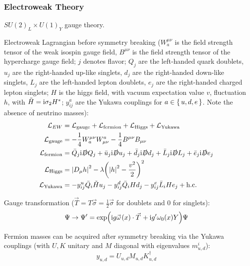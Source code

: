 		\subsubsection{Electroweak Theory}
			$SU(2)_L \times U(1)_Y$ gauge theory.

			Electroweak Lagrangian before symmetry breaking ($W_a^{\mu\nu}$ is the field strength tensor of the weak isospin gauge field, $B^{\mu\nu}$ is the field strength tensor of the hypercharge gauge field; $j$ denotes flavor; $Q_j$ are the left-handed quark doublets, $u_j$ are the right-handed up-like singlets, $d_j$ are the right-handed down-like singlets, $L_j$ are the left-handed lepton doublets, $e_j$ are the right-handed charged lepton singlets; $H$ is the higgs field, with vacuum expectation value $v$, fluctuation $h$, with $\tilde{H}=\mathrm{i}\sigma_2 H^{*}$; $y^a_{ij}$ are the Yukawa couplings for $a \in \set{u,d,e}$. Note the absence of neutrino masses):
			\begin{equation}
				\begin{aligned}
					\mathcal{L}_{EW} &= \mathcal{L}_{\text{gauge}} + \mathcal{L}_{\text{fermion}} + \mathcal{L}_{\text{Higgs}} + \mathcal{L}_{\text{Yukawa}} \\
					\mathcal{L}_{\text{gauge}} &= -\frac{1}{4} W_a^{\mu\nu} W^a_{\mu\nu} -\frac{1}{4} B^{\mu\nu} B_{\mu\nu} \\
					\mathcal{L}_{\text{fermion}} &= \bar{Q}_j \mathrm{i} \slashed{D} Q_j + \bar{u}_j \mathrm{i} \slashed{D} u_j + \bar{d}_j \mathrm{i} \slashed{D} d_j + \bar{L}_j \mathrm{i} \slashed{D} L_j + \bar{e}_j \mathrm{i} \slashed{D} e_j \\
					\mathcal{L}_{\text{Higgs}} &= \abs{D_\mu h}^2 - \lambda\qty(\abs{h}^2 -\frac{v^2}{2})^2 \\
					\mathcal{L}_{\text{Yukawa}} &= - y^u_{ij} \bar{Q}_{i} \tilde{H}  u_j - y^d_{ij} \bar{Q}_i H d_j - y^e_{ij} \bar{L}_i H e_j + \text{h.c.}
				\end{aligned}
			\end{equation}

			\noindent
			Gauge transformation ($\vec{T}=T\vec{\sigma}=\frac{1}{2}\vec{\sigma}$ for doublets and $0$ for singlets):
			\begin{equation}
				\Psi \to \Psi' = \exp(\i g \vec{\omega}(x)\cdot\vec{T}	+ \i g' \omega_0(x) Y) \Psi
			\end{equation}

			\noindent
			Fermion masses can be acquired after symmetry breaking via the Yukawa couplings (with $U,K$ unitary and $M$ diagonal with eigenvalues $m_{u,d}^i$):
			\begin{equation}
				y_{u,d} = U_{u,d} M_{u,d} K_{u,d}^\dagger
			\end{equation}

